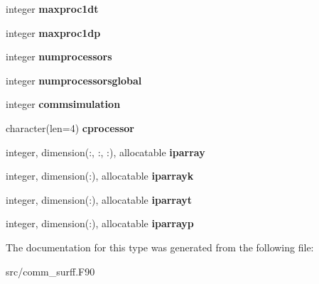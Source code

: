 \begin{DoxyCompactItemize}
integer {\bfseries maxproc1dt}
\item 
\mbox{\label{structcomm__surff_1_1commtype_a5d6fd0c0f1d716ffdc8ff05b6ba4896f}} 
integer {\bfseries maxproc1dp}
\item 
\mbox{\label{structcomm__surff_1_1commtype_a6e7073e8a90281cf344422ae2ee5de17}} 
integer {\bfseries numprocessors}
\item 
\mbox{\label{structcomm__surff_1_1commtype_ad27dbc379836bed2eaaca2d0aa4da852}} 
integer {\bfseries numprocessorsglobal}
\item 
\mbox{\label{structcomm__surff_1_1commtype_a6f436e9876f646f1cf9da13c91cd1a46}} 
integer {\bfseries commsimulation}
\item 
\mbox{\label{structcomm__surff_1_1commtype_ad535c47d173a1253ba13b167559ba61e}} 
character(len=4) {\bfseries cprocessor}
\item 
\mbox{\label{structcomm__surff_1_1commtype_a2a0578e5b7e2d6dc2ab2574be72882c9}} 
integer, dimension(\+:, \+:, \+:), allocatable {\bfseries iparray}
\item 
\mbox{\label{structcomm__surff_1_1commtype_a7a34335b6dee23a7f46da0311137f7e0}} 
integer, dimension(\+:), allocatable {\bfseries iparrayk}
\item 
\mbox{\label{structcomm__surff_1_1commtype_af2146653ec7592ee751f048c184614c6}} 
integer, dimension(\+:), allocatable {\bfseries iparrayt}
\item 
\mbox{\label{structcomm__surff_1_1commtype_a7a84107420c8d6c743ae7a059d9c270c}} 
integer, dimension(\+:), allocatable {\bfseries iparrayp}
\end{DoxyCompactItemize}


The documentation for this type was generated from the following file\+:\begin{DoxyCompactItemize}
\item 
src/comm\+\_\+surff.\+F90\end{DoxyCompactItemize}
